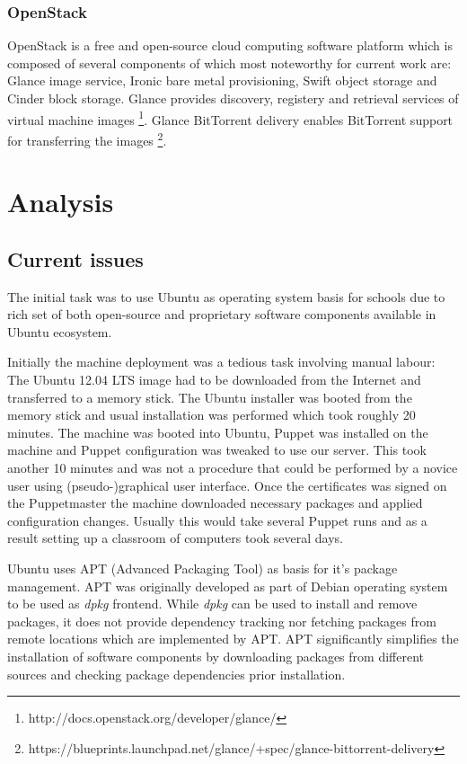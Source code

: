 \documentclass{article}
\begin{document}
\subsubsection{OpenStack}

OpenStack is a free and open-source cloud computing software platform
which is composed of several components of which most noteworthy for current work are:
Glance image service, Ironic bare metal provisioning,
Swift object storage and Cinder block storage.
Glance provides discovery, registery and retrieval services of virtual machine images
\footnote{http://docs.openstack.org/developer/glance/}.
Glance BitTorrent delivery enables BitTorrent support for transferring the images
\footnote{https://blueprints.launchpad.net/glance/+spec/glance-bittorrent-delivery}.





\section{Analysis}

\subsection{Current issues}

The initial task was to use Ubuntu as operating system basis
for schools due to rich set of both open-source and
proprietary software components available in Ubuntu ecosystem.

Initially the machine deployment was a tedious task involving
manual labour:
The Ubuntu 12.04 LTS image had to be downloaded from the Internet
and transferred to a memory stick.
The Ubuntu installer was booted from the memory stick
and usual installation was performed which took roughly 20 minutes.
The machine was booted into Ubuntu,
Puppet was installed on the machine and Puppet configuration
was tweaked to use our server.
This took another 10 minutes and was not a procedure that could
be performed by a novice user using (pseudo-)graphical user interface.
Once the certificates was signed on the Puppetmaster the
machine downloaded necessary packages and applied configuration
changes.
Usually this would take several Puppet runs and as a result
setting up a classroom of computers took several days.

Ubuntu uses APT (Advanced Packaging Tool) as basis for
it's package management.
APT was originally developed as part of Debian operating system
to be used as \emph{dpkg} frontend.
While \emph{dpkg} can be used to install and remove packages,
it does not provide dependency tracking nor fetching
packages from remote locations which are implemented by APT.
APT significantly simplifies the installation of software
components by downloading packages from different sources
and checking package dependencies prior installation.
\end{document}
